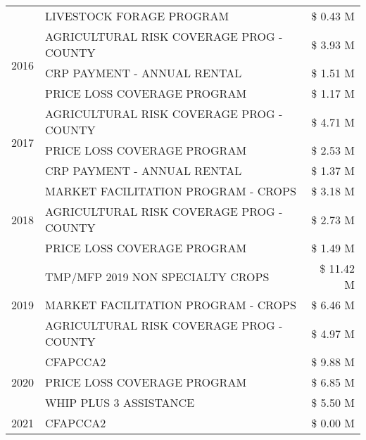 \begin{tabular}{llr}
 & LIVESTOCK FORAGE PROGRAM & \$ 0.43 M \\
\cline{1-3}
\multirow[t]{3}{*}{2016} & AGRICULTURAL RISK COVERAGE PROG - COUNTY & \$ 3.93 M \\
 & CRP PAYMENT - ANNUAL RENTAL & \$ 1.51 M \\
 & PRICE LOSS COVERAGE PROGRAM & \$ 1.17 M \\
\cline{1-3}
\multirow[t]{3}{*}{2017} & AGRICULTURAL RISK COVERAGE PROG - COUNTY & \$ 4.71 M \\
 & PRICE LOSS COVERAGE PROGRAM & \$ 2.53 M \\
 & CRP PAYMENT - ANNUAL RENTAL & \$ 1.37 M \\
\cline{1-3}
\multirow[t]{3}{*}{2018} & MARKET FACILITATION PROGRAM - CROPS & \$ 3.18 M \\
 & AGRICULTURAL RISK COVERAGE PROG - COUNTY & \$ 2.73 M \\
 & PRICE LOSS COVERAGE PROGRAM & \$ 1.49 M \\
\cline{1-3}
\multirow[t]{3}{*}{2019} & TMP/MFP 2019 NON SPECIALTY CROPS & \$ 11.42 M \\
 & MARKET FACILITATION PROGRAM - CROPS & \$ 6.46 M \\
 & AGRICULTURAL RISK COVERAGE PROG - COUNTY & \$ 4.97 M \\
\cline{1-3}
\multirow[t]{3}{*}{2020} & CFAPCCA2 & \$ 9.88 M \\
 & PRICE LOSS COVERAGE PROGRAM & \$ 6.85 M \\
 & WHIP PLUS 3 ASSISTANCE & \$ 5.50 M \\
\cline{1-3}
2021 & CFAPCCA2 & \$ 0.00 M \\
\cline{1-3}
\bottomrule
\end{tabular}
